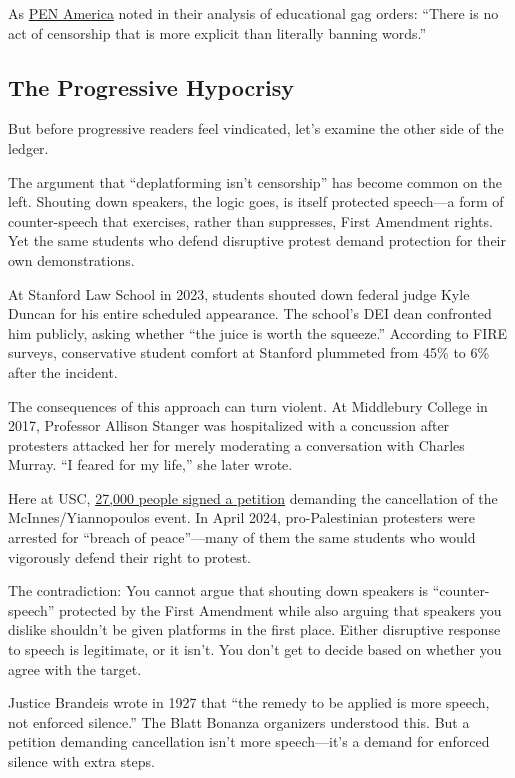 \documentclass[11pt]{article}
\begin{document}
As \href{https://pen.org/}{PEN America} noted in their analysis of educational gag orders: ``There is no act of censorship that is more explicit than literally banning words.''

\subsection{The Progressive Hypocrisy}

But before progressive readers feel vindicated, let's examine the other side of the ledger.

The argument that ``deplatforming isn't censorship'' has become common on the left. Shouting down speakers, the logic goes, is itself protected speech---a form of counter-speech that exercises, rather than suppresses, First Amendment rights. Yet the same students who defend disruptive protest demand protection for their own demonstrations.

At Stanford Law School in 2023, students shouted down federal judge Kyle Duncan for his entire scheduled appearance. The school's DEI dean confronted him publicly, asking whether ``the juice is worth the squeeze.'' According to FIRE surveys, conservative student comfort at Stanford plummeted from 45\% to 6\% after the incident.

The consequences of this approach can turn violent. At Middlebury College in 2017, Professor Allison Stanger was hospitalized with a concussion after protesters attacked her for merely moderating a conversation with Charles Murray. ``I feared for my life,'' she later wrote.

Here at USC, \href{https://www.postandcourier.com/education-lab/usc-doj-charlie-kirk-outdoor-event-controversial/article_c1d6ca0b-1173-403d-bd16-6f8fec66f748.html}{27,000 people signed a petition} demanding the cancellation of the McInnes/Yiannopoulos event. In April 2024, pro-Palestinian protesters were arrested for ``breach of peace''---many of them the same students who would vigorously defend their right to protest.

The contradiction: You cannot argue that shouting down speakers is ``counter-speech'' protected by the First Amendment while also arguing that speakers you dislike shouldn't be given platforms in the first place. Either disruptive response to speech is legitimate, or it isn't. You don't get to decide based on whether you agree with the target.

Justice Brandeis wrote in 1927 that ``the remedy to be applied is more speech, not enforced silence.'' The Blatt Bonanza organizers understood this. But a petition demanding cancellation isn't more speech---it's a demand for enforced silence with extra steps.
\end{document}
